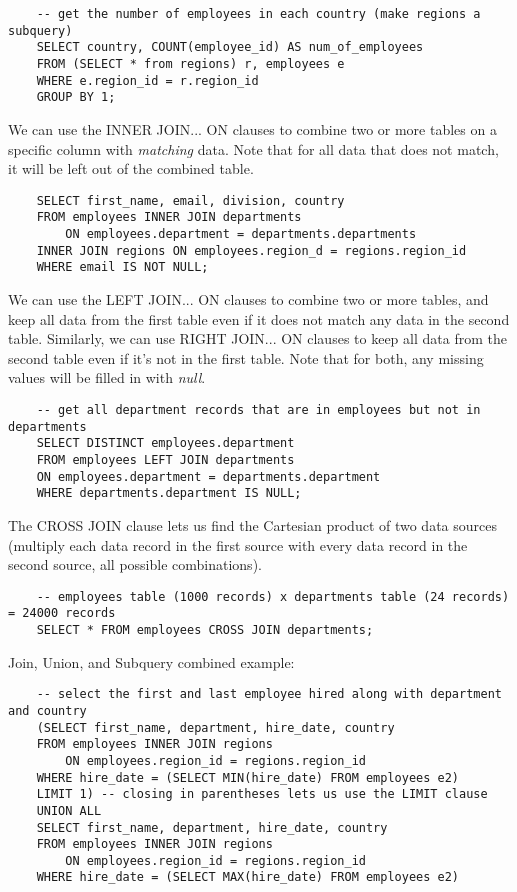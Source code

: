 \documentclass[11pt, a4paper]{article}
\begin{document}
\begin{spacing}{1.1}
\begin{lstlisting}
	-- get the number of employees in each country (make regions a subquery)
	SELECT country, COUNT(employee_id) AS num_of_employees
	FROM (SELECT * from regions) r, employees e
	WHERE e.region_id = r.region_id
	GROUP BY 1; \end{lstlisting} \vspace*{1mm}
	We can use the INNER JOIN... ON clauses to combine two or more tables on a specific column with \textit{matching} data. Note that for all data that does not match, it will be left out of the combined table.
	\begin{lstlisting}
	SELECT first_name, email, division, country
	FROM employees INNER JOIN departments
		ON employees.department = departments.departments
	INNER JOIN regions ON employees.region_d = regions.region_id 
	WHERE email IS NOT NULL; \end{lstlisting} \vspace*{1mm}
	We can use the LEFT JOIN... ON clauses to combine two or more tables, and keep all data from the first table even if it does not match any data in the second table. Similarly, we can use RIGHT JOIN... ON clauses to keep all data from the second table even if it's not in the first table. Note that for both, any missing values will be filled in with \textit{null}.

	\begin{lstlisting}
	-- get all department records that are in employees but not in departments
	SELECT DISTINCT employees.department
	FROM employees LEFT JOIN departments
	ON employees.department = departments.department
	WHERE departments.department IS NULL; \end{lstlisting} \vspace*{1mm}
	The CROSS JOIN clause lets us find the Cartesian product of two data sources (multiply each data record in the first source with every data record in the second source, all possible combinations). 
	\begin{lstlisting}
	-- employees table (1000 records) x departments table (24 records) = 24000 records
	SELECT * FROM employees CROSS JOIN departments; \end{lstlisting} \vspace*{1mm}
	Join, Union, and Subquery combined example:
	\begin{lstlisting}
	-- select the first and last employee hired along with department and country
	(SELECT first_name, department, hire_date, country
	FROM employees INNER JOIN regions
		ON employees.region_id = regions.region_id
	WHERE hire_date = (SELECT MIN(hire_date) FROM employees e2)
	LIMIT 1) -- closing in parentheses lets us use the LIMIT clause
	UNION ALL
	SELECT first_name, department, hire_date, country
	FROM employees INNER JOIN regions
		ON employees.region_id = regions.region_id
	WHERE hire_date = (SELECT MAX(hire_date) FROM employees e2)	\end{lstlisting} \vspace*{1mm}

\end{spacing}
\end{document}
